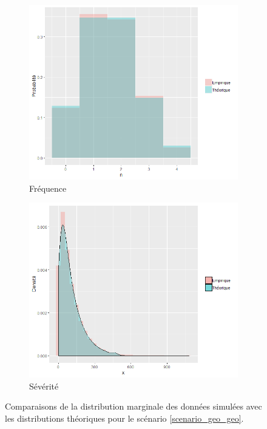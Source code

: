 \documentclass{article}
\begin{document}
		\begin{figure}[H]
			\begin{subfigure}[l]{0.5\textwidth}
				\includegraphics[width=\textwidth]{Graph/geo_geo_N.png}
				\caption{Fréquence}
			\end{subfigure}
			\begin{subfigure}[r]{0.5\textwidth}
				\includegraphics[width=\textwidth]{Graph/geo_geo_X.png}
				\caption{Sévérité}
			\end{subfigure}
			\caption{Comparaisons de la distribution marginale des données simulées avec les distributions théoriques pour le scénario \ref{scenario_geo_geo}.}
			\label{graph_densite_geo_geo}
		\end{figure}
		
\end{document}
